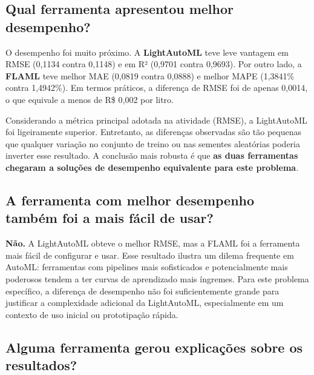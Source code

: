 \documentclass[11pt, a4paper, oneside]{article}
\begin{document}
\subsection{Qual ferramenta apresentou melhor desempenho?}
\label{sec:melhor-desempenho}

O desempenho foi muito próximo. A \textbf{LightAutoML} teve leve vantagem em RMSE
(0,1134 contra 0,1148) e em R² (0,9701 contra 0,9693). Por outro lado, a
\textbf{FLAML} teve melhor MAE (0,0819 contra 0,0888) e melhor MAPE (1,3841\%
contra 1,4942\%). Em termos práticos, a diferença de RMSE foi de apenas 0,0014,
o que equivale a menos de R\$ 0,002 por litro.

Considerando a métrica principal adotada na atividade (RMSE), a LightAutoML foi
ligeiramente superior. Entretanto, as diferenças observadas são tão pequenas que
qualquer variação no conjunto de treino ou nas sementes aleatórias poderia inverter
esse resultado. A conclusão mais robusta é que \textbf{as duas ferramentas chegaram
a soluções de desempenho equivalente para este problema}.

\subsection{A ferramenta com melhor desempenho também foi a mais fácil de usar?}
\label{sec:facilidade-vs-desempenho}

\textbf{Não.} A LightAutoML obteve o melhor RMSE, mas a FLAML foi a ferramenta mais
fácil de configurar e usar. Esse resultado ilustra um dilema frequente em AutoML:
ferramentas com pipelines mais sofisticados e potencialmente mais poderosos tendem
a ter curvas de aprendizado mais íngremes. Para este problema específico, a diferença
de desempenho não foi suficientemente grande para justificar a complexidade adicional
da LightAutoML, especialmente em um contexto de uso inicial ou prototipação rápida.

\subsection{Alguma ferramenta gerou explicações sobre os resultados?}
\label{sec:explicacoes}
\end{document}
